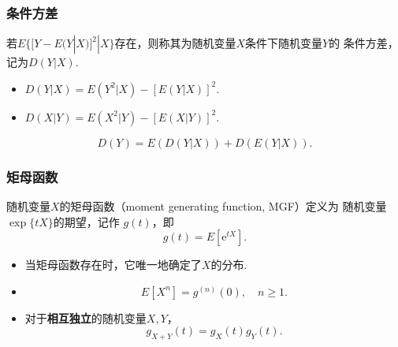 \begin{frame}
    \frametitle{条件方差}
    \begin{mydefinition}[条件方差]
        若$E\{[Y-E(Y|X)]^2|X\}$存在，则称其为随机变量$X$条件下随机变量$Y$的
        条件方差，记为$D(Y|X)$.
    \end{mydefinition}
    \begin{myproposition}[条件方差的性质]
        \begin{itemize}
            \item $D(Y|X)=E\left(Y^2|X\right)-[E(Y|X)]^2$.
            \item $D(X|Y)=E\left(X^2|Y\right)-[E(X|Y)]^2$.
        \end{itemize}
    \end{myproposition}
    \begin{myproposition}
        \begin{equation*}
            D(Y)=E(D(Y|X))+D(E(Y|X)).
        \end{equation*}
    \end{myproposition}
\end{frame}

\begin{frame}
    \frametitle{矩母函数}
    \begin{mydefinition}[矩母函数]
        随机变量$X$的矩母函数（moment generating function, MGF）定义为
        随机变量$\exp\{tX\}$的期望，记作
        $g(t)$，即
        \begin{equation}
            g(t)=E\left[\mathrm e^{tX}\right].
        \end{equation}
    \end{mydefinition}
    \begin{myproposition}[矩母函数的性质]
        \begin{itemize}
            \item 当矩母函数存在时，它唯一地确定了$X$的分布.
            \item \begin{equation}
                E\left[X^n\right]=g^{(n)}(0),\quad n\geqslant 1.
            \end{equation}
            \item 对于\textbf{相互独立}的随机变量$X,Y$，
            \begin{equation}
                g_{X+Y}(t)=g_X(t)g_Y(t).
            \end{equation}
        \end{itemize}
    \end{myproposition}
\end{frame}

